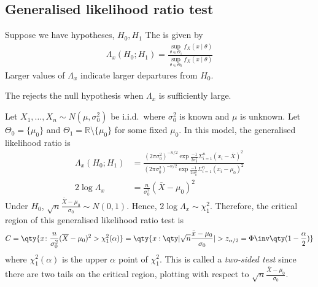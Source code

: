 \subsection{Generalised likelihood ratio test}

\begin{definition}
	Suppose we have hypotheses, $H_0, H_1$
	The  is given by
	\begin{align*}
		\Lambda_x(H_0; H_1) = \frac{\sup_{\theta \in \Theta_1} f_X(x \mid \theta)}{\sup_{\theta \in \Theta_0} f_X(x \mid \theta)}
	\end{align*}
	Larger values of $\Lambda_x$ indicate larger departures from $H_0$.

	The  rejects the null hypothesis when $\Lambda_x$ is sufficiently large.
\end{definition}

\begin{example} \label{exm:2}
	Let $X_1, \dots, X_n \sim N(\mu, \sigma_0^2)$ be i.i.d.\ where $\sigma_0^2$ is known and $\mu$ is unknown.
	Let $\Theta_0 = \{\mu_0\}$ and $\Theta_1 = \mathbb{R} \setminus \{\mu_0\}$ for some fixed $\mu_0$.
	In this model, the generalised likelihood ratio is
	\begin{align*}
		\Lambda_x(H_0; H_1) &= \frac{(2 \pi \sigma_0^2)^{-n/2} \exp{\frac{-1}{2\sigma_0^2} \Sigma_{i=1}^n (x_i - \overline X)^2}}{(2 \pi \sigma_0^2)^{-n/2} \exp{\frac{-1}{2\sigma_0^2} \Sigma_{i=1}^n (x_i - \mu_0)^2}} \\
		2\log \Lambda_x &= \frac{n}{\sigma_0^2}(\overline X - \mu_0)^2
	\end{align*}
	Under $H_0$, $\sqrt{n} \frac{\overline X - \mu_0}{\sigma_0} \sim N(0,1)$.
	Hence, $2 \log \Lambda_x \sim \chi_1^2$.
	Therefore, the critical region of this generalised likelihood ratio test is
	\begin{align*}
		C = \qty{x \colon \frac{n}{\sigma_0^2}(\overline X - \mu_0)^2 > \chi_1^2(\alpha)} = \qty{x: \qty| \sqrt{n} \frac{\bar{x} - \mu_0}{\sigma_0} | > z_{\alpha / 2} = \Phi\inv \qty(1 - \frac{\alpha}{2})}
	\end{align*}
	where $\chi_1^2(\alpha)$ is the upper $\alpha$ point of $\chi_1^2$.
	This is called a \textit{two-sided test} since there are two tails on the critical region, plotting with respect to $\sqrt{n} \frac{\overline X - \mu_0}{\sigma_0}$.
\end{example}

